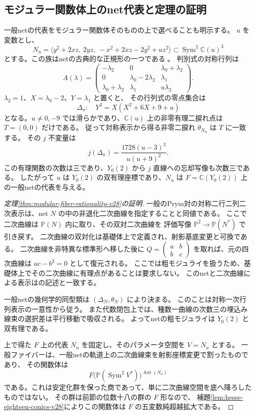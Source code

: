 \subsection{モジュラー関数体上のnet代表と定理の証明}

一般netの代表をモジュラー関数体そのものの上で選べることも明示する。
$u$ を変数とし、
\[
 N_u=\langle y^2+2xz,\ 2yz,\ -x^2+2xz-2y^2+uz^2\rangle
 \subset\operatorname{Sym}^2\mathbb C(u)^3
\]
とする。この族はnetの古典的な正規形の一つである
\cite[\S3.2, \S5]{DomokosFeherRimanyi2013}。
判別式の対称行列は
\[
 A(\lambda)=
 \begin{pmatrix}
 -\lambda_2&0&\lambda_0+\lambda_2\\
 0&\lambda_0-2\lambda_2&\lambda_1\\
 \lambda_0+\lambda_2&\lambda_1&u\lambda_2
 \end{pmatrix}.
\]
$\lambda_2=1$、$X=\lambda_0-2$、$Y=\lambda_1$ と置くと、
その行列式の零点集合は
\[
 \Delta_u:\quad Y^2=X(X^2+6X+9+u)
\]
となる。$u\ne0,-9$ では滑らかであり、$\mathbb C(u)$ 上の非零有理二捩れ点は
$T=(0,0)$ だけである。
従って対称表示から得る非零二捩れ $\theta_{N_u}$ は $T$ に一致する。
その $j$ 不変量は
\[
 j(\Delta_u)=\frac{1728(u-3)^3}{u(u+9)^2}.
\]
この有理関数の次数は三であり、$Y_0(2)$ から $j$ 直線への忘却写像も次数三である。
したがって $u$ は $Y_0(2)$ の双有理座標であり、$N_u$ は
$F=\mathbb C(Y_0(2))$ 上の一般netの代表を与える。

\begin{proof}[定理\ref{thm:modular-fiber-rationality-v28}の証明]
一般のPrym対の対称二行二列二次表示は、net $N$ の中の非退化二次曲線を指定することと同値である。
ここで二次曲線は $\mathbb P(N)$ 内に取り、その双対二次曲線を
評価写像 $\mathbb P^2\to\mathbb P(N^*)$ で引き戻す。
二次曲線の双対化は基礎体上で定義され、射影基底変更と可換である。
二次曲線を非特異な標準形へ移した後に $Q=\left(\begin{smallmatrix}a&b\\b&c\end{smallmatrix}\right)$
を取れば、元の四次曲線は $ac-b^2=0$ として復元される。
ここでは粗モジュライを扱うため、基礎体上でその二次曲線に有理点があることは要求しない。
このnetと二次曲線による表示は\cite[Remark 4.1]{DolgachevRationality2008}の記述と一致する。

一般netの幾何学的同型類は $(\Delta_N,\theta_N)$ により決まる。
このことは対称一次行列表示の一意性から従う。
また代数閉包上では、種数一曲線の次数三の埋込み線束の選択差は平行移動で吸収される。
よってnetの粗モジュライは $Y_0(2)$ と双有理である。

上で得た $F$ 上の代表 $N_u$ を固定し、そのパラメータ空間を $V=N_u$ とする。
一般ファイバーは、一般netの軌道上の二次曲線束を射影座標変更で割ったものであり、
その関数体は
\[
 F\bigl(\mathbb P(\operatorname{Sym}^2V^*)\bigr)^{\operatorname{Aut}(N_u)}
\]
である。これは安定化群を保った商であって、単に二次曲線空間を底へ降ろしたものではない。
その群は前節の位数十八の群の $F$ 形なので、
補題\ref{lem:hesse-eighteen-conics-v28}によりこの関数体は
$F$ の五変数純超越拡大である。
\end{proof}

